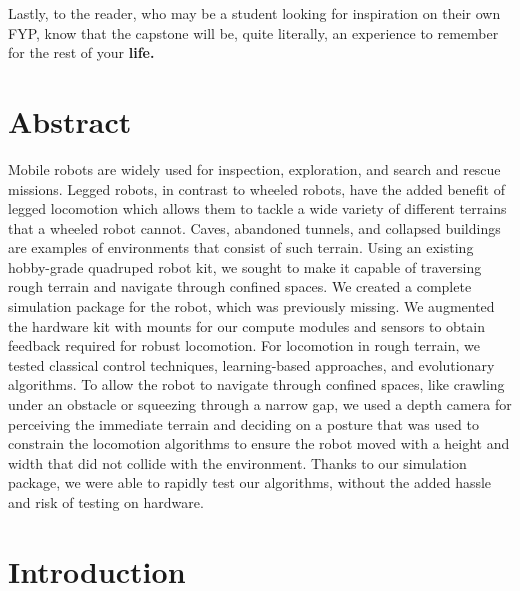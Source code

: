 \documentclass[12pt,twoside]{report}
\begin{document}
Lastly, to the reader, who may be a student looking for inspiration on their own FYP, know that the capstone will be, quite literally, an experience to remember for the rest of your \textbf{life.}  

\chapter*{Abstract}
Mobile robots are widely used for inspection, exploration, and search and rescue missions. Legged robots, in contrast to wheeled robots, have the added benefit of legged locomotion which allows them to tackle a wide variety of different terrains that a wheeled robot cannot. Caves, abandoned tunnels, and collapsed buildings are examples of environments that consist of such terrain. Using an existing hobby-grade quadruped robot kit, we sought to make it capable of traversing rough terrain and navigate through confined spaces. We created a complete simulation package for the robot, which was previously missing. We augmented the hardware kit with mounts for our compute modules and sensors to obtain feedback required for robust locomotion. For locomotion in rough terrain, we tested classical control techniques, learning-based approaches, and evolutionary algorithms. To allow the robot to navigate through confined spaces, like crawling under an obstacle or squeezing through a narrow gap, we used a depth camera for perceiving the immediate terrain and deciding on a posture that was used to constrain the locomotion algorithms to ensure the robot moved with a height and width that did not collide with the environment. Thanks to our simulation package, we were able to rapidly test our algorithms, without the added hassle and risk of testing on hardware. 

\tableofcontents
\listoffigures
\listoftables

\chapter{Introduction}
\label{chap:intro}

\end{document}
